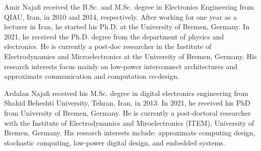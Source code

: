 \begin{IEEEbiography}{Amir Najafi} received the B.Sc. and M.Sc. degree in Electronics Engineering from QIAU, Iran, in 2010 and 2014, respectively. After working for one year as a lecturer in Iran, he started his Ph.D. at the University of Bremen, Germany. In 2021, he received the Ph.D. degree from the department of physics and electronics. He is currently a post-doc researcher in the Institute of Electrodynamics and Microelectronics at the University of Bremen, Germany. His research interests focus mainly on low-power interconnect architectures and approximate communication and computation co-design.
\end{IEEEbiography}

\begin{IEEEbiography}{Ardalan Najafi} received his M.Sc. degree in digital electronics engineering from Shahid Beheshti University, Tehran, Iran, in 2013. In 2021, he received his PhD from University of Bremen, Germany. He is currently a post-doctoral researcher with the Institute of Electrodynamics and Miroelectronics (ITEM), University of Bremen, Germany. His research interests include: approximate computing design, stochastic computing, low-power digital design, and embedded systems.
\end{IEEEbiography}

